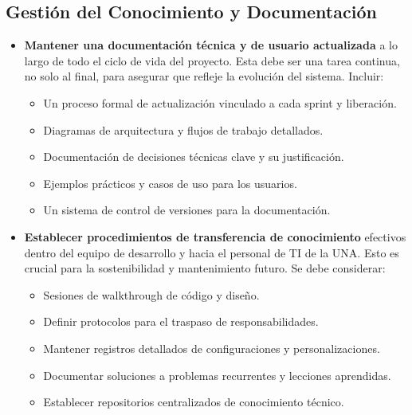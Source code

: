 \subsection{Gestión del Conocimiento y Documentación}
\begin{itemize}
    \item \textbf{Mantener una documentación técnica y de usuario actualizada}
        a lo largo de todo el ciclo de vida del proyecto. Esta debe ser una tarea
        continua, no solo al final, para asegurar que refleje la evolución del sistema.
        Incluir:
        \begin{itemize}
            \item Un proceso formal de actualización vinculado a cada sprint y liberación.
            \item Diagramas de arquitectura y flujos de trabajo detallados.
            \item Documentación de decisiones técnicas clave y su justificación.
            \item Ejemplos prácticos y casos de uso para los usuarios.
            \item Un sistema de control de versiones para la documentación.
        \end{itemize}

    \item \textbf{Establecer procedimientos de transferencia de conocimiento}
        efectivos dentro del equipo de desarrollo y hacia el personal de TI de la UNA.
        Esto es crucial para la sostenibilidad y mantenimiento futuro. Se debe considerar:
        \begin{itemize}
            \item Sesiones de walkthrough de código y diseño.
            \item Definir protocolos para el traspaso de responsabilidades.
            \item Mantener registros detallados de configuraciones y personalizaciones.
            \item Documentar soluciones a problemas recurrentes y lecciones aprendidas.
            \item Establecer repositorios centralizados de conocimiento técnico.
        \end{itemize}


\end{itemize}

